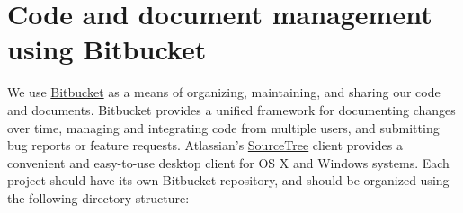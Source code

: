 \documentclass{tufte-book} %
\begin{document}
 \section{Code and document management using Bitbucket}\label{sec:bitbucket}
 We use \href{https://www.bitbucket.org/}{Bitbucket} as a means of organizing, maintaining, and sharing
 our code and documents.  Bitbucket provides a unified framework for
 documenting changes over time, managing and integrating code from
 multiple users, and submitting bug reports or feature requests. 
Atlassian's
 \href{https://www.atlassian.com/software/sourcetree/overview?_mid=1ba3573dadf246f44f2a97bc50bfd72e&gclid=Cj0KEQiA4OqnBRDAj9aazvPji9ABEiQANq28oBGvgRhznXBb_RDL6QRe0IM7vvEUXFkRDoWBSbpmsmAaAkCE8P8HAQ}{SourceTree}
 client provides a convenient and easy-to-use desktop client for OS X
 and Windows systems.  Each project should have its own Bitbucket
 repository, and should be organized using the following directory structure:
\end{document}

